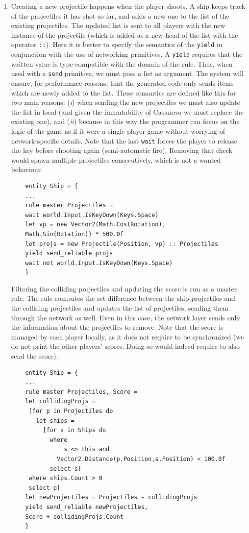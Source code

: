 \begin{enumerate}
	\item Creating a new projectile happens when the player shoots. A ship keeps track of the projectiles it has shot so far, and adds a new one to the list of the existing projectiles. The updated list is sent to all players with the new instance of the projectile (which is added as a new head of the list with the operator \texttt{::}). Here it is better to specify the semantics of the \texttt{yield} in conjunction with the use of networking primitives. A \texttt{yield} requires that the written value is type-compatible with the domain of the rule. Thus, when used with a \texttt{send} primitive, we must pass a list as argument. The system will ensure, for performance reasons, that the generated code only sends items which are newly added to the list. These semantics are defined like this for two main reasons: (\textit{i}) when sending the new projectiles we must also update the list in local (and given the immutability of Casanova we must replace the existing one), and (\textit{ii}) because in this way the programmer can focus on the logic of the game as if it were a single-player game without worrying of network-specific details. Note that the last \texttt{wait} forces the player to release the key before shooting again (semi-automatic fire). Removing that check would spawn multiple projectiles consecutively, which is not a wanted behaviour.
	
	\begin{lstlisting}
	entity Ship = {
	...
	rule master Projectiles =
	wait world.Input.IsKeyDown(Keys.Space)
	let vp = new Vector2(Math.Cos(Rotation), 
	Math.Sin(Rotation)) * 500.0f
	let projs = new Projectile(Position, vp) :: Projectiles
	yield send_reliable projs
	wait not world.Input.IsKeyDown(Keys.Space)
	}
	\end{lstlisting}
	
	Filtering the colliding projectiles and updating the score is run as a master rule. The rule computes the set difference between the ship projectiles and the colliding projectiles and updates the list of projectiles, sending them through the network as well. Even in this case, the network layer sends only the information about the projectiles to remove. Note that the score is managed by each player locally, as it does not require to be synchronized (we do not print the other players' scores. Doing so would indeed require to also send the score).
	
	\begin{lstlisting}
	entity Ship = {
	...
	rule master Projectiles, Score =
  	let collidingProjs =
  	 [for p in Projectiles do
  	   let ships =
  	     [for s in Ships do
  	       where 
	           s <> this and 
  	         Vector2.Distance(p.Position,s.Position) < 100.0f
  	       select s]
  	 where ships.Count > 0
  	 select p]
  	let newProjectiles = Projectiles - collidingProjs
  	yield send_reliable newProjectiles, 
  	Score + collidingProjs.Count 
	}
	\end{lstlisting}
\end{enumerate}

